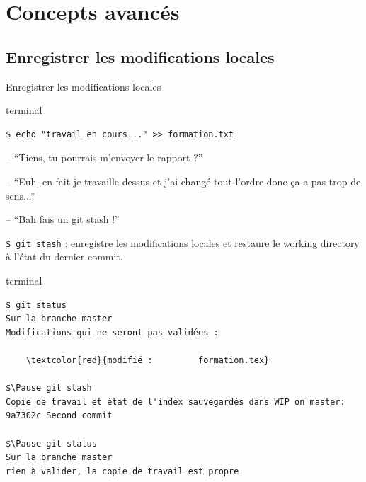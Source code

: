 \documentclass[usepdftitle=false]{beamer}
\def\seplength{.3\topsep}
\newcommand{\Pause}{%
\ifdef{\Release}
  {\pause}
  {}
}
\begin{document}
\section{Concepts avancés}

\subsection{Enregistrer les modifications locales}

\begin{frame}[fragile]{Enregistrer les modifications locales}

	\begin{beamercolorbox}[rounded=true,shadow=true]{terminal}
\vspace{-\seplength}
\begin{Verbatim}
$ echo "travail en cours..." >> formation.txt
\end{Verbatim}
	\end{beamercolorbox}

	\Pause

	\begin{block}{}
		-- \enquote{Tiens, tu pourrais m'envoyer le rapport ?} \\
		\Pause
		-- \enquote{Euh, en fait je travaille dessus et j'ai changé tout l'ordre donc ça a pas trop de sens...} \\
		\Pause
		-- \enquote{Bah fais un git stash !}
	\end{block}

	\verb+$ git stash+ : enregistre les modifications locales et restaure le working directory à l'état du dernier commit.

	\Pause

	\begin{beamercolorbox}[rounded=true,shadow=true]{terminal}
\vspace{-\seplength}
	\begin{Verbatim}
$ git status
Sur la branche master
Modifications qui ne seront pas validées :

	\textcolor{red}{modifié :         formation.tex}

$\Pause git stash
Copie de travail et état de l'index sauvegardés dans WIP on master: 9a7302c Second commit

$\Pause git status
Sur la branche master
rien à valider, la copie de travail est propre
\end{Verbatim}
	\end{beamercolorbox}
\end{frame}
\end{document}
